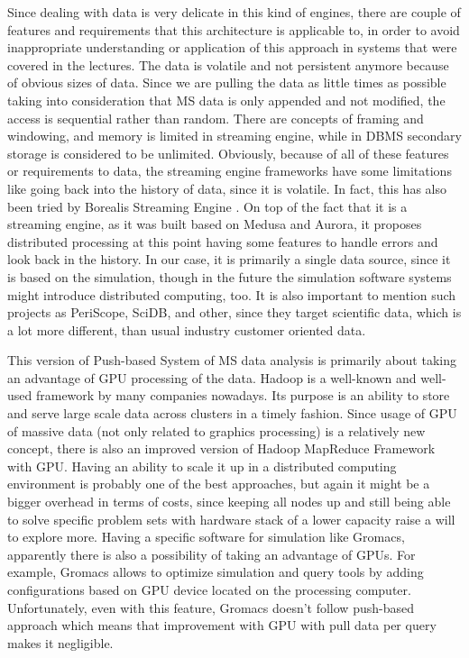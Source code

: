 \documentclass[11pt,a4paper]{report}
\begin{document}
Since dealing with data is very delicate in this kind of engines, there are couple of features and requirements that this architecture is applicable to, in order to avoid inappropriate understanding or application of this approach in systems that were covered in the lectures\cite{DataStreamManagement}. The data is volatile and not persistent anymore because of obvious sizes of data.  Since we are pulling the data as little times as possible taking into consideration that MS data is only appended and not modified, the access is sequential rather than random. There are concepts of framing and windowing, and memory is limited in streaming engine, while in DBMS secondary storage is considered to be unlimited. Obviously, because of all of these features or requirements to data, the streaming engine frameworks have some limitations like going back into the history of data, since it is volatile. In fact, this has also been tried by Borealis Streaming Engine \cite{borealis}. On top of the fact that it is a streaming engine, as it was built based on Medusa\cite{medusa} and Aurora\cite{aurora}, it proposes distributed processing at this point having some features to handle errors and look back in the history. In our case, it is primarily a single data source, since it is based on the simulation, though in the future the simulation software systems might introduce distributed computing, too. It is also important to mention such projects as PeriScope\cite{PeriScope}, SciDB\cite{SciDB}, and other\cite{SDSS_SIGMOD02,QBISM_ICDE94}, since they target scientific data, which is a lot more different, than usual industry customer oriented data.

This version of Push-based System of MS data analysis is primarily about taking an advantage of GPU processing of the data. Hadoop is a well-known and well-used framework by many companies nowadays\cite{hadoop}. Its purpose is an ability to store and serve large scale data across clusters in a timely fashion. Since usage of GPU of massive data (not only related to graphics processing) is a relatively new concept, there is also an improved version of Hadoop MapReduce Framework with GPU\cite{hadoopgpu}. Having an ability to scale it up in a distributed computing environment is probably one of the best approaches, but again it might be a bigger overhead in terms of costs, since keeping all nodes up and still being able to solve specific problem sets with hardware stack of a lower capacity raise a will to explore more. Having a specific software for simulation like Gromacs, apparently there is also a possibility of taking an advantage of GPUs. For example, Gromacs allows to optimize simulation and query tools by adding configurations based on GPU device located on the processing computer. Unfortunately, even with this feature, Gromacs doesn't follow push-based approach which means that improvement with GPU with pull data per query makes it negligible.
\end{document}
